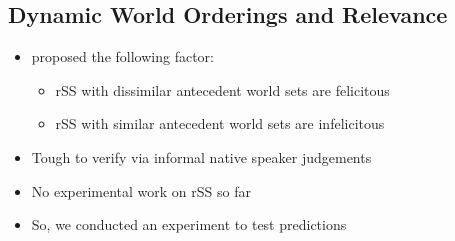 \subsection{Dynamic World Orderings and Relevance}
\begin{frame}[t]
\subsectionpage\vskip 9pt%
\begin{itemize}
    \item \citet{Lewis2017} proposed the following factor:\vskip 9pt
        \begin{itemize}
            \item<2-> rSS with dissimilar antecedent world sets are felicitous
            \item<3-> rSS with similar antecedent world sets are infelicitous
        \end{itemize}
\end{itemize}\vskip 18pt
\vskip 9pt
\begin{itemize}
    \item<5-> Tough to verify via informal native speaker judgements
    \item<6-> No experimental work on rSS so far\vskip 9pt
    \item<7-> So, we conducted an experiment to test  predictions
\end{itemize}
    
\end{frame}

